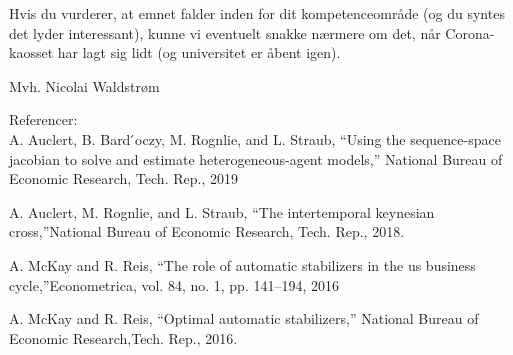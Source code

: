 Hvis du vurderer, at emnet falder inden for dit kompetenceområde (og du syntes det lyder interessant), kunne vi eventuelt snakke nærmere om det, når Corona-kaosset har lagt sig lidt (og universitet er åbent igen). 


Mvh. 
Nicolai Waldstrøm 


Referencer: \\
A. Auclert, B. Bard ́oczy, M. Rognlie, and L. Straub, “Using the sequence-space jacobian to solve and estimate heterogeneous-agent models,” National Bureau of Economic Research, Tech. Rep., 2019

A. Auclert,  M. Rognlie,  and L. Straub,  “The intertemporal keynesian cross,”National Bureau of Economic Research, Tech. Rep., 2018.

A.  McKay  and  R.  Reis,  “The  role  of  automatic  stabilizers  in  the  us  business cycle,”Econometrica, vol. 84, no. 1, pp. 141–194, 2016

A.  McKay  and  R.  Reis, “Optimal automatic stabilizers,” National Bureau of Economic Research,Tech. Rep., 2016.







